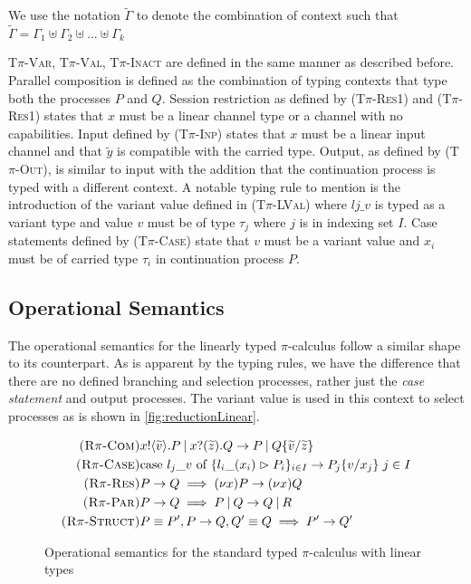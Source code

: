We use the notation $\widetilde{\Gamma}$ to denote the combination of context such that $\widetilde{\Gamma} = \Gamma_1 \uplus \Gamma_2 \uplus ... \uplus \Gamma_k$

\textsc{T$\pi$-Var}, \textsc{T$\pi$-Val}, \textsc{T$\pi$-Inact} are defined in the same manner as described before. Parallel composition is defined as the combination of typing contexts that type both the processes $P$ and $Q$. Session restriction as defined by \textsc{(T$\pi$-Res1)} and \textsc{(T$\pi$-Res1)} states that $x$ must be a linear channel type or a channel with no capabilities.  Input defined by \textsc{(T$\pi$-Inp)} states that $x$ must be a linear input channel and that $\widetilde{y}$ is compatible with the carried type. Output, as defined by \textsc{(T$\pi$-Out)}, is similar to input with the addition that the continuation process is typed with a different context. A notable typing rule to mention is the introduction of the variant value defined in \textsc{(T$\pi$-LVal)} where $lj\_v$ is typed as a variant type and value $v$ must be of type $\tau_j$ where $j$ is in  indexing set $I$. Case statements defined by \textsc{(T$\pi$-Case)} state that $v$ must be a variant value and $x_i$ must be of carried type $\tau_i$ in continuation process $P$. 

\subsection{Operational Semantics}

The operational semantics for the linearly typed $\pi$-calculus follow a similar shape to its counterpart. As is apparent by the typing rules, we have the difference that there are no defined branching and selection processes, rather just the \textit{case statement} and output processes. The variant value is used in this context to select processes as is shown in \autoref{fig:reductionLinear}.

\begin{figure}[h]
    \centering
    \begin{align*}
        \begin{split}
            \textsc{(R$\pi$-Com)} & x!\langle \widetilde{v} \rangle.P \: | \: x?(\widetilde{z}).Q \rightarrow P \: | \: Q \{\widetilde{v} / \widetilde{z}\} \\
            \textsc{(R$\pi$-Case)} & \text{case } l_j\_v \text{ of } \{l_i\_(x_i) \vartriangleright P_i\}_{i \in I} \rightarrow P_j\{v/x_j\} \hspace{3pt} j \in I\\
            \textsc{(R$\pi$-Res)} & P \rightarrow Q \implies (\nu x) P \rightarrow (\nu x) Q \\
            \textsc{(R$\pi$-Par)} & P \rightarrow Q \implies P \: | \: Q \rightarrow Q \: | \: R \\
            \textsc{(R$\pi$-Struct)} & P \equiv P', P \rightarrow Q, Q' \equiv Q \implies P' \rightarrow Q'
        \end{split}
    \end{align*}
    \caption{Operational semantics for the standard typed $\pi$-calculus with linear types}
    \label{fig:reductionLinear}
\end{figure}

